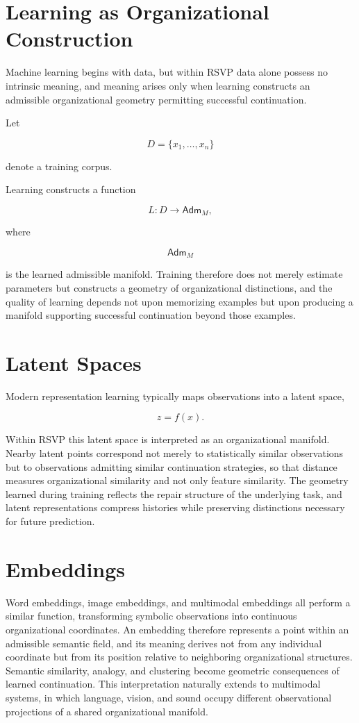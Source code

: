 \documentclass[11pt,oneside]{book}
\numberwithin{equation}{chapter}
\theoremstyle{definition}
\theoremstyle{plain}
\newcommand{\Adm}{\mathsf{Adm}}
\begin{document}
\section{Learning as Organizational Construction}

Machine learning begins with data, but within RSVP data alone possess no intrinsic meaning, and meaning arises only when learning constructs an admissible organizational geometry permitting successful continuation.

Let

\[
D
=
\{x_1,\ldots,x_n\}
\]

denote a training corpus.

Learning constructs a function

\[
L
:
D
\rightarrow
\Adm_M,
\]

where

\[
\Adm_M
\]

is the learned admissible manifold. Training therefore does not merely estimate parameters but constructs a geometry of organizational distinctions, and the quality of learning depends not upon memorizing examples but upon producing a manifold supporting successful continuation beyond those examples.

\section{Latent Spaces}

Modern representation learning typically maps observations into a latent
space,

\[
z
=
f(x).
\]

Within RSVP this latent space is interpreted as an organizational manifold. Nearby latent points correspond not merely to statistically similar observations but to observations admitting similar continuation strategies, so that distance measures organizational similarity and not only feature similarity. The geometry learned during training reflects the repair structure of the underlying task, and latent representations compress histories while preserving distinctions necessary for future prediction.

\section{Embeddings}

Word embeddings, image embeddings, and multimodal embeddings all perform a similar function, transforming symbolic observations into continuous organizational coordinates. An embedding therefore represents a point within an admissible semantic field, and its meaning derives not from any individual coordinate but from its position relative to neighboring organizational structures. Semantic similarity, analogy, and clustering become geometric consequences of learned continuation. This interpretation naturally extends to multimodal systems, in which language, vision, and sound occupy different observational projections of a shared organizational manifold.
\end{document}
